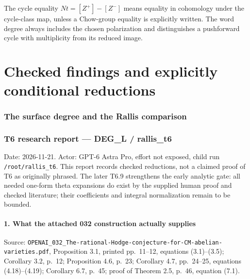 \documentclass[11pt,a4paper]{article}
\providecommand{\tightlist}{\setlength{\itemsep}{0pt}\setlength{\parskip}{0pt}}
\theoremstyle{definition}
\begin{document}
The cycle equality $Nt=[Z^+]-[Z^-]$ means equality in cohomology under the
cycle-class map, unless a Chow-group equality is explicitly written. The
word degree always includes the chosen polarization and distinguishes a
pushforward cycle with multiplicity from its reduced image.

\part{Checked findings and explicitly conditional reductions}

\section{The surface degree and the Rallis comparison}

\providecommand{\tightlist}{\setlength{\itemsep}{0pt}\setlength{\parskip}{0pt}}
\providecommand{\passthrough}[1]{#1}
\section{T6 research report --- DEG\_L / rallis\_t6}\label{t6-research-report-deg_l-rallis_t6}

Date: 2026-11-21. Actor: GPT-6 Astra Pro, effort not exposed, child run \texttt{/root/rallis\_t6}. This report records checked reductions, not a claimed proof of T6 as originally phrased. The later T6.9 strengthens the early analytic gate: all needed one-form theta expansions do exist by the supplied human proof and checked literature; their coefficients and integral normalization remain to be bounded.

\subsection{1. What the attached 032 construction actually supplies}\label{what-the-attached-032-construction-actually-supplies}

Source: \texttt{OPENAI\_032\_The-rational-Hodge-conjecture-for-CM-abelian-varieties.pdf}, Proposition 3.1, printed pp.~11--12, equations (3.1)--(3.5); Corollary 3.2, p.~12; Proposition 4.6, p.~23; Corollary 4.7, pp.~24--25, equations (4.18)--(4.19); Corollary 6.7, p.~45; proof of Theorem 2.5, p.~46, equation (7.1).
\end{document}
